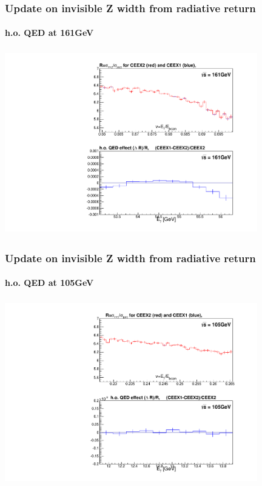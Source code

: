 \documentclass{beamer}
\begin{document}
\begin{frame}[fragile]
\frametitle{\bf Update on invisible Z width from radiative return}
\framesubtitle{\bf\large h.o. QED at 161GeV}

\includegraphics[width=110mm,height=80mm]{./cCeex21rat_E161.pdf}
\end{frame}

\begin{frame}[fragile]
\frametitle{\bf Update on invisible Z width from radiative return}
\framesubtitle{\bf\large h.o. QED at 105GeV}

\includegraphics[width=110mm,height=80mm]{./cCeex21rat_E105.pdf}
\end{frame}
\end{document}
